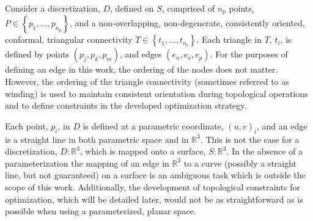 Consider a discretization, $D$, defined on $S$, comprised of $n_p$
points, $P \in \left\{p_1,...,p_{n_p} \right\}$, and a non-overlapping,
non-degenerate, consistently oriented, conformal, triangular
connectivity $T \in \left\{t_1,...,t_{n_t} \right\}$. Each triangle in
$T$, $t_i$, is defined by points $\left(p_j, p_k, p_m\right)$, and edges
$\left(e_n, e_o, e_p\right)$. For the purposes of defining an edge in this
work, the ordering of the nodes does not matter.  However, the ordering of the
triangle connectivity (sometimes referred to as winding) is used to maintain
consistent orientation during topological operations and to define constraints
in the developed optimization strategy.

Each point, $p_i$, in $D$ is defined at a parametric coordinate,
$\left(u,v\right)_i$, and an edge is a straight line in both parametric
space and in ${\mathbb R}^3$. This is not the case for a discretization,
$D:{\mathbb R}^3$, which is mapped onto a surface, $S:{\mathbb R}^3$. In the
absence of a parameterization the mapping of an edge in ${\mathbb R}^3$ to a
curve (possibly a straight line, but not guaranteed) on a surface is an
ambiguous task which is outside the scope of this work.  Additionally, the
development of topological constraints for optimization, which will be detailed
later, would not be as straightforward as is possible when using a
parameterized, planar space.
